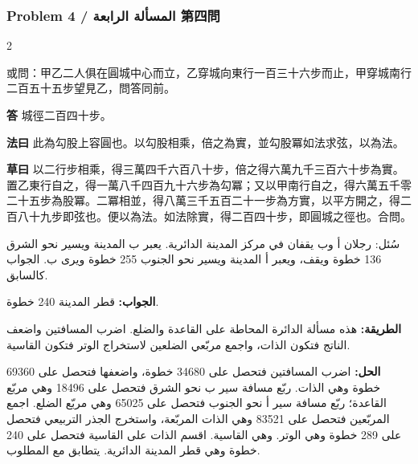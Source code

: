 \documentclass[11pt,a4paper]{article}
\newcommand{\ar}[1]{\arabicfont\beginR #1\endR}
\newcommand{\Answer}[1]{\par\noindent\textbf{\color{problemcolor}答} #1\par}
\newcommand{\Method}[1]{\par\noindent\textbf{\color{problemcolor}法曰} #1\par}
\newcommand{\Workings}[1]{\par\noindent\textbf{\color{problemcolor}草曰} #1\par}
\newcommand{\AnswerAr}{\par\noindent\textbf{\color{problemcolor}\ar{الجواب:}} }
\newcommand{\MethodAr}{\par\noindent\textbf{\color{problemcolor}\ar{الطريقة:}} }
\newcommand{\WorkingsAr}{\par\noindent\textbf{\color{problemcolor}\ar{الحل:}} }
\begin{document}
\vspace{0.5cm}

\subsubsection*{Problem 4 / \ar{المسألة الرابعة} \quad 第四問}

\begin{paracol}{2}

\noindent 或問：甲乙二人俱在圓城中心而立，乙穿城向東行一百三十六步而止，甲穿城南行二百五十五步望見乙，問答同前。

\vspace{0.2cm}

\Answer{城徑二百四十步。}

\vspace{0.2cm}

\Method{此為勾股上容圓也。以勾股相乘，倍之為實，並勾股冪如法求弦，以為法。}

\vspace{0.2cm}

\Workings{以二行步相乘，得三萬四千六百八十步，倍之得六萬九千三百六十步為實。置乙東行自之，得一萬八千四百九十六步為勾冪；又以甲南行自之，得六萬五千零二十五步為股冪。二冪相並，得八萬三千五百二十一步為方實，以平方開之，得二百八十九步即弦也。便以為法。如法除實，得二百四十步，即圓城之徑也。合問。}

\switchcolumn

\ar{سُئل: رجلان أ وب يقفان في مركز المدينة الدائرية. يعبر ب المدينة ويسير نحو الشرق 136 خطوة ويقف، ويعبر أ المدينة ويسير نحو الجنوب 255 خطوة ويرى ب. الجواب كالسابق.}

\vspace{0.2cm}

\AnswerAr{قطر المدينة 240 خطوة.}

\vspace{0.2cm}

\MethodAr{هذه مسألة الدائرة المحاطة على القاعدة والضلع. اضرب المسافتين واضعف الناتج فتكون الذات، واجمع مربّعي الضلعين لاستخراج الوتر فتكون القاسية.}

\vspace{0.2cm}

\WorkingsAr{اضرب المسافتين فتحصل على 34680 خطوة، واضعفها فتحصل على 69360 خطوة وهي الذات. ربّع مسافة سير ب نحو الشرق فتحصل على 18496 وهي مربّع القاعدة؛ ربّع مسافة سير أ نحو الجنوب فتحصل على 65025 وهي مربّع الضلع. اجمع المربّعين فتحصل على 83521 وهي الذات المربّعة، واستخرج الجذر التربيعي فتحصل على 289 خطوة وهي الوتر. وهي القاسية. اقسم الذات على القاسية فتحصل على 240 خطوة وهي قطر المدينة الدائرية. يتطابق مع المطلوب.}

\end{paracol}
\end{document}
